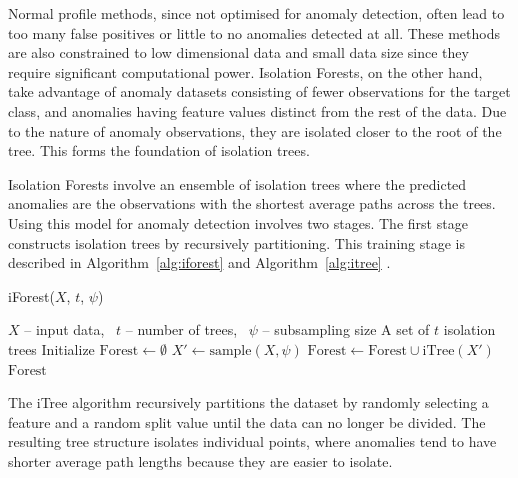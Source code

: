 \documentclass[10pt, conference]{IEEEtran}
\begin{document}
Normal profile methods, since not optimised for anomaly detection, often lead to too many false positives or little to no anomalies detected at all. These methods are also constrained to low dimensional data and small data size since they require significant computational power. Isolation Forests, on the other hand, take advantage of anomaly datasets consisting of fewer observations for the target class, and anomalies having feature values distinct from the rest of the data. Due to the nature of anomaly observations, they are isolated closer to the root of the tree. This forms the foundation of isolation trees.

Isolation Forests involve an ensemble of isolation trees where the predicted anomalies are the observations with the shortest average paths across the trees. Using this model for anomaly detection involves two stages. The first stage constructs isolation trees by recursively partitioning. This training stage is described in Algorithm~\ref{alg:iforest} and Algorithm~\ref{alg:itree} \cite{iforest2}.

\begin{algorithm}[H]
	\caption{iForest($X$, $t$, $\psi$)}
	\label{alg:iforest}
	\begin{algorithmic}[1]
		\Require $X$ -- input data, \ $t$ -- number of trees, \ $\psi$ -- subsampling size
		\Ensure A set of $t$ isolation trees
		\State Initialize $\text{Forest} \gets \emptyset$
		\State $X' \gets \text{sample}(X, \psi)$
		\State $\text{Forest} \gets \text{Forest} \cup \text{iTree}(X')$
		\EndFor \\
		\Return $\text{Forest}$
	\end{algorithmic}
\end{algorithm}

The iTree algorithm recursively partitions the dataset by randomly selecting a feature and a random split value until the data can no longer be divided. The resulting tree structure isolates individual points, where anomalies tend to have shorter average path lengths because they are easier to isolate.
\end{document}
